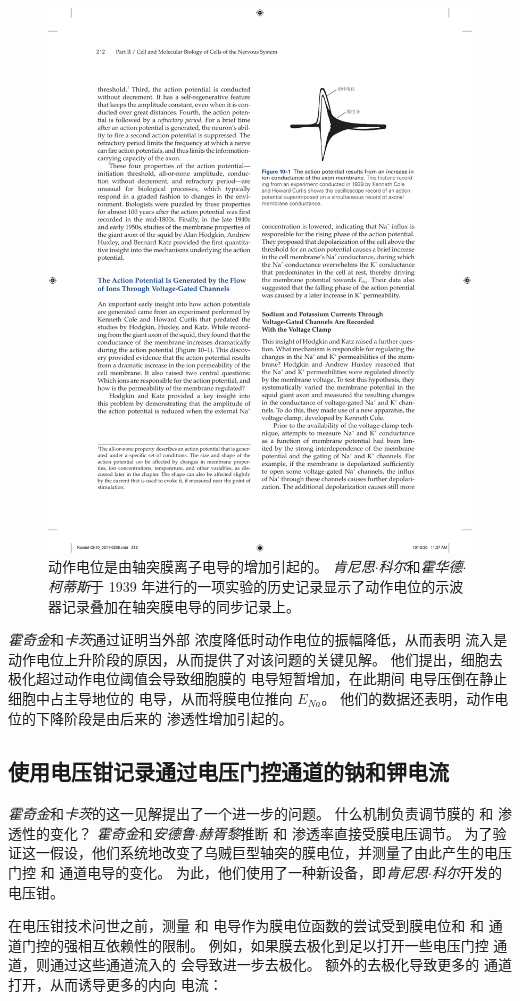 \begin{figure}[htbp]
	\centering
	\includegraphics[width=0.5\linewidth]{chap10/fig_10_1}
	\caption{动作电位是由轴突膜离子电导的增加引起的。
		\textit{肯尼思$\cdot$科尔}和\textit{霍华德$\cdot$柯蒂斯}于 1939 年进行的一项实验的历史记录显示了动作电位的示波器记录叠加在轴突膜电导的同步记录上。}
	\label{fig:10_1}
\end{figure}


\textit{霍奇金}和\textit{卡茨}通过证明当外部  浓度降低时动作电位的振幅降低，从而表明  流入是动作电位上升阶段的原因，从而提供了对该问题的关键见解。
他们提出，细胞去极化超过动作电位阈值会导致细胞膜的  电导短暂增加，在此期间  电导压倒在静止细胞中占主导地位的  电导，从而将膜电位推向 $E_{Na}$。 
他们的数据还表明，动作电位的下降阶段是由后来的  渗透性增加引起的。



\subsection{使用电压钳记录通过电压门控通道的钠和钾电流}

\textit{霍奇金}和\textit{卡茨}的这一见解提出了一个进一步的问题。
什么机制负责调节膜的  和  渗透性的变化？
\textit{霍奇金}和\textit{安德鲁$\cdot$赫胥黎}推断  和  渗透率直接受膜电压调节。
为了验证这一假设，他们系统地改变了乌贼巨型轴突的膜电位，并测量了由此产生的电压门控  和  通道电导的变化。
为此，他们使用了一种新设备，即\textit{肯尼思$\cdot$科尔}开发的电压钳。


在电压钳技术问世之前，测量  和  电导作为膜电位函数的尝试受到膜电位和  和  通道门控的强相互依赖性的限制。
例如，如果膜去极化到足以打开一些电压门控  通道，则通过这些通道流入的  会导致进一步去极化。 
额外的去极化导致更多的  通道打开，从而诱导更多的内向  电流：


